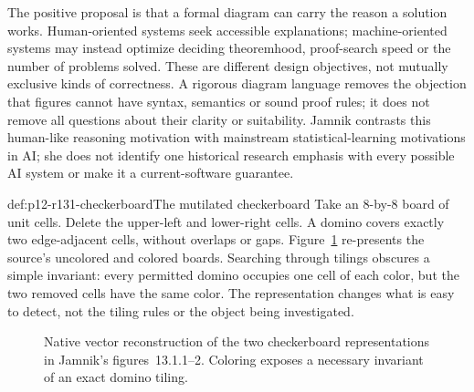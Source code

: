 The positive proposal is that a formal diagram can carry the reason a
solution works. Human-oriented systems seek accessible explanations;
machine-oriented systems may instead optimize deciding theoremhood,
proof-search speed or the number of problems solved. These are different
design objectives, not mutually exclusive kinds of correctness. A
rigorous diagram language removes the objection that figures cannot
have syntax, semantics or sound proof rules; it does not remove all
questions about their clarity or suitability. Jamnik contrasts this
human-like reasoning motivation with mainstream statistical-learning
motivations in AI; she does not identify one historical research emphasis
with every possible AI system or make it a current-software guarantee.

\begin{hbexample}{def:p12-r131-checkerboard}{The mutilated checkerboard}
Take an \(8\)-by-\(8\) board of unit cells. Delete the upper-left and
lower-right cells. A domino covers exactly two edge-adjacent cells,
without overlaps or gaps. Figure~\ref{fig:p12-r131-checkerboard}
re-presents the source's uncolored and colored boards. Searching through
tilings obscures a simple invariant: every permitted domino occupies
one cell of each color, but the two removed cells have the same color.
The representation changes what is easy to detect, not the tiling rules
or the object being investigated.
\end{hbexample}

\begin{figure}[htbp]
\centering
{}
\caption{Native vector reconstruction of the two checkerboard
representations in Jamnik's figures~13.1.1--2. Coloring exposes a
necessary invariant of an exact domino tiling.}
\label{fig:p12-r131-checkerboard}
\end{figure}

